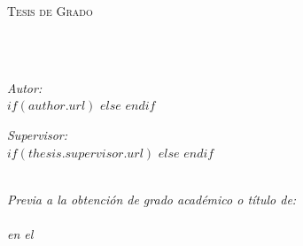 \frontmatter %

\pagestyle{plain} %


\begin{titlepage}
\begin{center}

\vspace*{.06\textheight}
{\scshape\LARGE \univname\par}\vspace{1.5cm} %
\textsc{\Large Tesis de Grado}\\[0.5cm] %

\HRule \\[0.4cm] %
{\huge \bfseries \ttitle\par}\vspace{0.4cm} %
\HRule \\[1.5cm] %
 
\begin{minipage}[t]{0.4\textwidth}
\begin{flushleft} \large
\emph{Autor:}\\
$if(author.url)$
\href{$author.url$}{\authorname} %
$else$
\authorname
$endif$
\end{flushleft}
\end{minipage}
\begin{minipage}[t]{0.4\textwidth}
\begin{flushright} \large
\emph{Supervisor:} \\
$if(thesis.supervisor.url)$%
\href{$thesis.supervisor.url$}{\supname} %
$else$%
\supname
$endif$
\end{flushright}
\end{minipage}\\[2cm]
 

\large \textit{Previa a la obtención de grado académico o título de:\\ \degreename}\\[0.3cm] %
\textit{en el}\\[0.4cm]
\groupname\\
\deptname\\[2cm] %
 

\end{center}
\end{titlepage}
